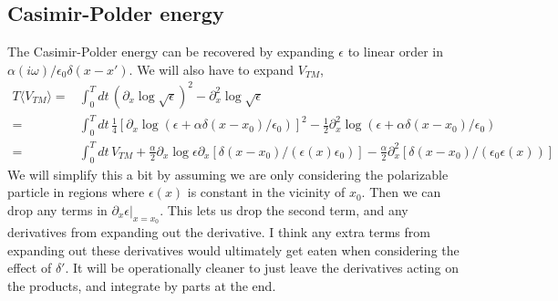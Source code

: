 \subsection{Casimir-Polder energy}

The Casimir-Polder energy can be recovered by expanding $\epsilon$ to linear order in $\alpha(i\omega)/\epsilon_0\delta(x-x').$
  We will also have to expand $V_{TM}$,
\begin{align}
T\langle V_{TM}\rangle =& \int_0^Tdt\, (\partial_x\log\sqrt{\epsilon})^2 - \partial_x^2\log\sqrt{\epsilon}\\
=& \int_0^Tdt\, \frac{1}{4}[\partial_x\log(\epsilon + \alpha\delta(x-x_0)/\epsilon_0)]^2 
- \frac{1}{2}\partial_x^2\log(\epsilon + \alpha\delta(x-x_0)/\epsilon_0)\\
=& \int_0^Tdt\, V_{TM} +\frac{\alpha}{2}\partial_x\log\epsilon\partial_x[\delta(x-x_0)/(\epsilon(x)\epsilon_0)]
 - \frac{\alpha}{2}\partial_x^2[\delta(x-x_0)/(\epsilon_0\epsilon(x))]
\end{align}
We will simplify this a bit by assuming we are only considering the polarizable particle in regions 
where $\epsilon(x)$ is constant in the vicinity of $x_0$.
  Then we can drop any terms in $\partial_x\epsilon|_{x=x_0}$.
  This lets us drop the second term, and any derivatives from expanding out the derivative.
  I think any extra terms from expanding out these derivatives would ultimately get eaten when
 considering the effect of $\delta'$.
  It will be operationally cleaner to just leave the derivatives acting on the products, 
and integrate by parts at the end. 

